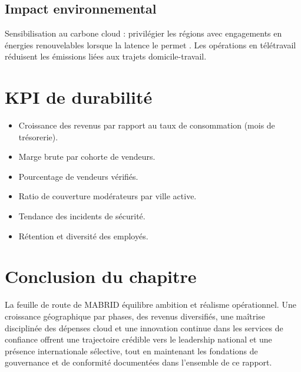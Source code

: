 \subsection{Impact environnemental}

Sensibilisation au carbone cloud : privilégier les régions avec engagements en énergies renouvelables lorsque la latence le permet \parencite{microsoftSustainability}. Les opérations en télétravail réduisent les émissions liées aux trajets domicile-travail.

\section{KPI de durabilité}

\begin{itemize}
  \item Croissance des revenus par rapport au taux de consommation (mois de trésorerie).
  \item Marge brute par cohorte de vendeurs.
  \item Pourcentage de vendeurs vérifiés.
  \item Ratio de couverture modérateurs par ville active.
  \item Tendance des incidents de sécurité.
  \item Rétention et diversité des employés.
\end{itemize}

\section{Conclusion du chapitre}

La feuille de route de MABRID équilibre ambition et réalisme opérationnel. Une croissance géographique par phases, des revenus diversifiés, une maîtrise disciplinée des dépenses cloud et une innovation continue dans les services de confiance offrent une trajectoire crédible vers le leadership national et une présence internationale sélective, tout en maintenant les fondations de gouvernance et de conformité documentées dans l'ensemble de ce rapport.
